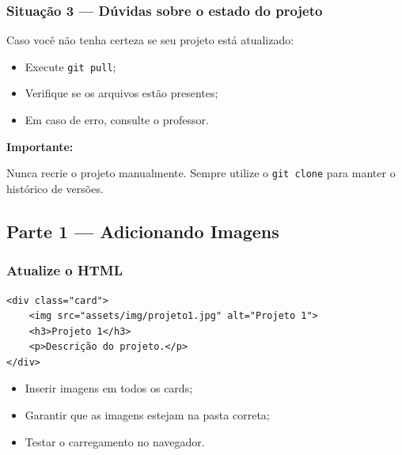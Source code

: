 \documentclass[12pt,a4paper]{article}
\begin{document}
\subsubsection{Situação 3 — Dúvidas sobre o estado do projeto}

Caso você não tenha certeza se seu projeto está atualizado:

\begin{itemize}
\item Execute \texttt{git pull};
\item Verifique se os arquivos estão presentes;
\item Em caso de erro, consulte o professor.
\end{itemize}

\begin{boxDica}
\textbf{Importante:}

Nunca recrie o projeto manualmente.  
Sempre utilize o \texttt{git clone} para manter o histórico de versões.
\end{boxDica}


\newpage


\subsection{Parte 1 — Adicionando Imagens}

\subsubsection{Atualize o HTML}

\begin{boxCodigo}
\begin{verbatim}
<div class="card">
    <img src="assets/img/projeto1.jpg" alt="Projeto 1">
    <h3>Projeto 1</h3>
    <p>Descrição do projeto.</p>
</div>
\end{verbatim}
\end{boxCodigo}

\begin{boxAtividade}[Atividade 1]

\begin{itemize}
\item Inserir imagens em todos os cards;
\item Garantir que as imagens estejam na pasta correta;
\item Testar o carregamento no navegador.
\end{itemize}

\end{boxAtividade}
\end{document}
